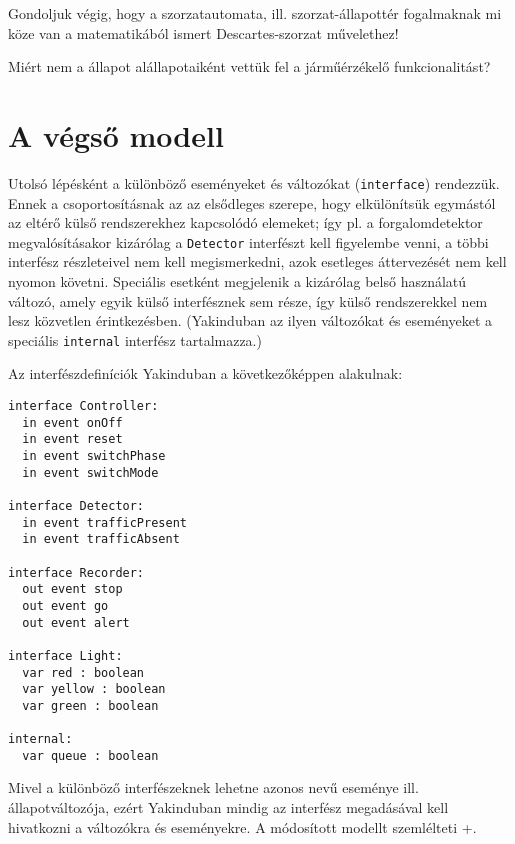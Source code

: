 \begin{feladat}
Gondoljuk végig, hogy a szorzatautomata, ill. szorzat-állapottér fogalmaknak mi köze van a matematikából ismert Descartes-szorzat művelethez!
\end{feladat}

\begin{feladat}
Miért nem a  állapot alállapotaiként vettük fel a járműérzékelő funkcionalitást?
\end{feladat}

\section{A végső modell}

Utolsó lépésként a különböző eseményeket és változókat  (\lstinline{interface}) rendezzük. Ennek a csoportosításnak az az elsődleges szerepe, hogy elkülönítsük egymástól az eltérő külső rendszerekhez kapcsolódó elemeket; így pl. a forgalomdetektor megvalósításakor kizárólag a \lstinline{Detector} interfészt kell figyelembe venni, a többi interfész részleteivel nem kell megismerkedni, azok esetleges áttervezését nem kell nyomon követni. Speciális esetként megjelenik a kizárólag belső használatú  változó, amely egyik külső interfésznek sem része, így külső rendszerekkel nem lesz közvetlen érintkezésben. (Yakinduban az ilyen változókat és eseményeket a speciális \lstinline{internal} interfész tartalmazza.)

Az interfészdefiníciók Yakinduban a következőképpen alakulnak:

\begin{lstlisting}
interface Controller:
  in event onOff
  in event reset
  in event switchPhase
  in event switchMode

interface Detector:
  in event trafficPresent
  in event trafficAbsent

interface Recorder:
  out event stop
  out event go
  out event alert

interface Light:
  var red : boolean
  var yellow : boolean
  var green : boolean

internal:
  var queue : boolean
\end{lstlisting}

Mivel a különböző interfészeknek lehetne azonos nevű eseménye ill. állapotváltozója, ezért Yakinduban mindig az interfész megadásával kell hivatkozni a változókra és eseményekre. A módosított modellt szemlélteti \az+.

